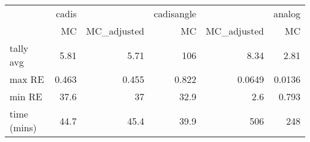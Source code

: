\begin{tabular}{lrrrrr}
\toprule
{} & cadis &             & cadisangle &             & analog \\
{} &    MC & MC\_adjusted &         MC & MC\_adjusted &     MC \\
\midrule
tally avg   &  5.81 &        5.71 &        106 &        8.34 &   2.81 \\
max RE      & 0.463 &       0.455 &      0.822 &      0.0649 & 0.0136 \\
min RE      &  37.6 &          37 &       32.9 &         2.6 &  0.793 \\
time (mins) &  44.7 &        45.4 &       39.9 &         506 &    248 \\
\bottomrule
\end{tabular}
